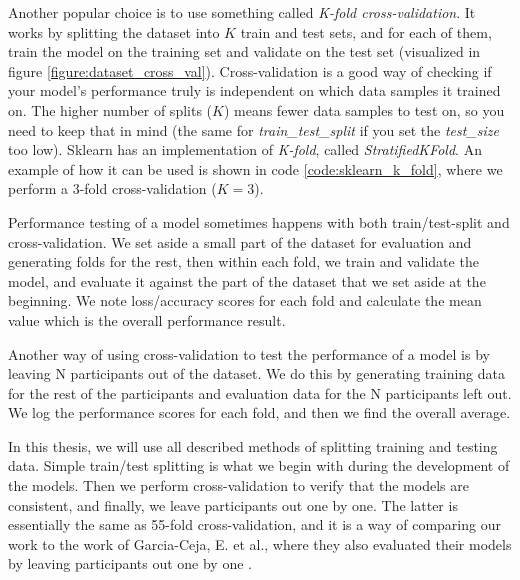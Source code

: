 Another popular choice is to use something called \textit{K-fold cross-validation}. It works by splitting the dataset into $K$ train and test sets, and for each of them, train the model on the training set and validate on the test set (visualized in figure \ref{figure:dataset_cross_val}). Cross-validation is a good way of checking if your model's performance truly is independent on which data samples it trained on. The higher number of splits ($K$) means fewer data samples to test on, so you need to keep that in mind (the same for \textit{train\_test\_split} if you set the \textit{test\_size} too low). Sklearn has an implementation of \textit{K-fold}, called \textit{StratifiedKFold}. An example of how it can be used is shown in code \ref{code:sklearn_k_fold}, where we perform a 3-fold cross-validation ($K = 3$). 

Performance testing of a model sometimes happens with both train/test-split and cross-validation. We set aside a small part of the dataset for evaluation and generating folds for the rest, then within each fold, we train and validate the model, and evaluate it against the part of the dataset that we set aside at the beginning. We note loss/accuracy scores for each fold and calculate the mean value which is the overall performance result.

Another way of using cross-validation to test the performance of a model is by leaving N participants out of the dataset. We do this by generating training data for the rest of the participants and evaluation data for the N participants left out. We log the performance scores for each fold, and then we find the overall average. 

In this thesis, we will use all described methods of splitting training and testing data. Simple train/test splitting is what we begin with during the development of the models. Then we perform cross-validation to verify that the models are consistent, and finally, we leave participants out one by one. The latter is essentially the same as 55-fold cross-validation, and it is a way of comparing our work to the work of Garcia-Ceja, E. et al., where they also evaluated their models by leaving participants out one by one \cite{GarciaCeja2018_classification_bipolar}. 
